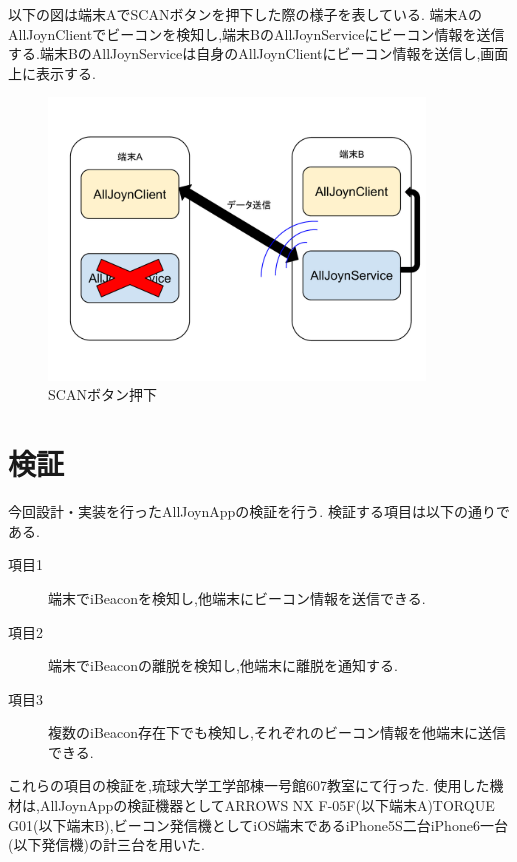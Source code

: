 以下の図は端末AでSCANボタンを押下した際の様子を表している.
端末AのAllJoynClientでビーコンを検知し,端末BのAllJoynServiceにビーコン情報を送信する.端末BのAllJoynServiceは自身のAllJoynClientにビーコン情報を送信し,画面上に表示する.

\begin{figure}[htbp]
\centering
\includegraphics[width=10cm]{fig/click_scan.pdf}
\caption{SCANボタン押下}
\end{figure}

\newpage

\section{検証}
今回設計・実装を行ったAllJoynAppの検証を行う.
検証する項目は以下の通りである.

\begin{description}
\item[項目1] 端末でiBeaconを検知し,他端末にビーコン情報を送信できる.
\item[項目2] 端末でiBeaconの離脱を検知し,他端末に離脱を通知する.
\item[項目3] 複数のiBeacon存在下でも検知し,それぞれのビーコン情報を他端末に送信できる.
\end{description}

これらの項目の検証を,琉球大学工学部棟一号館607教室にて行った.
使用した機材は,AllJoynAppの検証機器としてARROWS NX F-05F(以下端末A)TORQUE G01(以下端末B),ビーコン発信機としてiOS端末であるiPhone5S二台iPhone6一台(以下発信機)の計三台を用いた.


